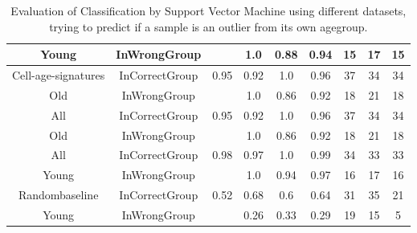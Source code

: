 \begin{table}[H]
\begin{tabular}{|c|c|c|c|c|c|c|c|c|}
		Young & InWrongGroup &   & 1.0 & 0.88 & 0.94 & 15 & 17 & 15 \\
		\hline
		Cell-age-signatures & InCorrectGroup & 0.95 & 0.92 & 1.0 & 0.96 & 37 & 34 & 34 \\
		Old & InWrongGroup &   & 1.0 & 0.86 & 0.92 & 18 & 21 & 18 \\
		\hline
		\hline
		\rowcolor{gray!20}
		All & InCorrectGroup & 0.95 & 0.92 & 1.0 & 0.96 & 37 & 34 & 34 \\
		\rowcolor{gray!20}
		Old & InWrongGroup &   & 1.0 & 0.86 & 0.92 & 18 & 21 & 18 \\
		\hline
		\rowcolor{gray!20}
		All & InCorrectGroup & 0.98 & 0.97 & 1.0 & 0.99 & 34 & 33 & 33 \\
		\rowcolor{gray!20}
		Young & InWrongGroup &   & 1.0 & 0.94 & 0.97 & 16 & 17 & 16 \\
		\hline
		\hline
		Randombaseline & InCorrectGroup & 0.52 & 0.68 & 0.6 & 0.64 & 31 & 35 & 21 \\
		Young & InWrongGroup &   & 0.26 & 0.33 & 0.29 & 19 & 15 & 5 \\
		\hline
	\end{tabular}
	\caption{Evaluation of Classification by Support Vector Machine using different datasets, trying to predict if a sample is an outlier from its own agegroup.}
	\label{tab:CompareOutliersClassificationSupport Vector Machine}
\end{table}
